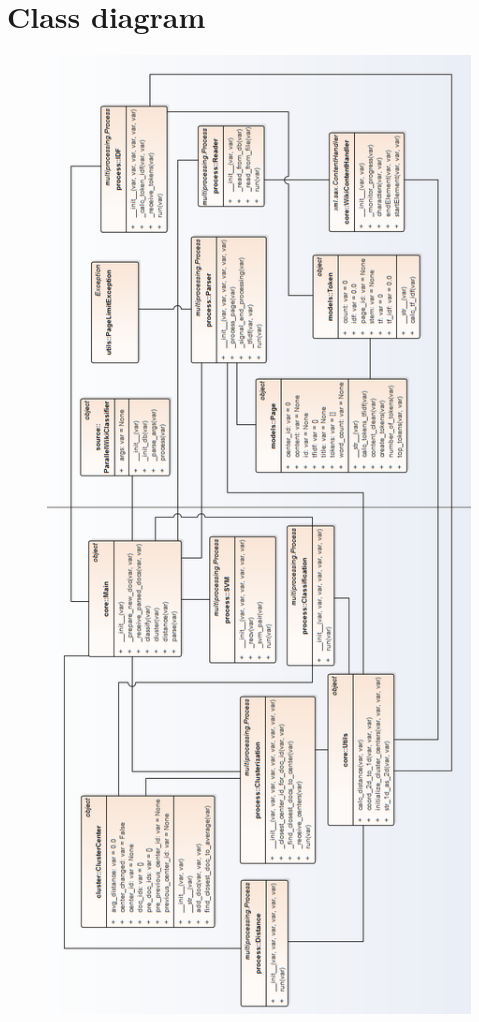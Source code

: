 \appendix
\chapter{Class diagram} \label{appendix-class}
\begin{figure}[h]
	\begin{center}
		\includegraphics[width=0.72\linewidth]{images/diagrams/class3svm-h.png}
		\label{appendix-class-diagram}
	\end{center}
\end{figure}

